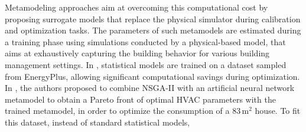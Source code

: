 \documentclass[12pt]{article}
\begin{document}

Metamodeling approaches aim at overcoming this computational cost by proposing surrogate models that replace the physical simulator during calibration and optimization tasks. The parameters of such metamodels are estimated during a training phase using simulations conducted by a physical-based model, that aims at exhaustively capturing the building behavior for various building management settings. In \cite{Bre2020AnEM, Reynolds2018AZB}, statistical models are trained on a dataset sampled from EnergyPlus, allowing significant computational savings during optimization. In \cite{Bre2020AnEM}, the authors proposed to combine NSGA-II with an artificial neural network metamodel to obtain a Pareto front of optimal HVAC parameters with the trained metamodel, in order to optimize the consumption of a $83\,\mathrm{m}^2$ house. %
To fit this dataset, instead of standard statistical models, %
\end{document}
